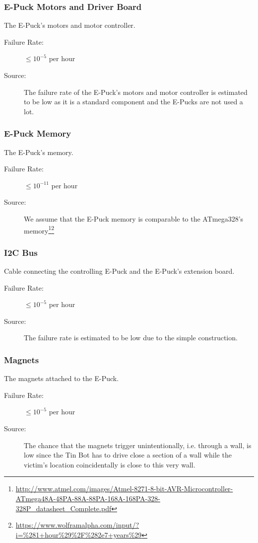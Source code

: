 \documentclass[a4paper,parskip,headheight=38pt]{scrartcl} %
\begin{document}
\subsubsection{E-Puck Motors and Driver Board}
The E-Puck's motors and motor controller.
\begin{description}
	\item[Failure Rate:] $\leq 10^{-5}$ per hour
	\item[Source:] The failure rate of the E-Puck's motors and motor controller is estimated to be low as it is a standard component and the E-Pucks are not used a lot.
\end{description}

\subsubsection{E-Puck Memory}
The E-Puck's memory.
\begin{description}
	\item[Failure Rate:] $\leq 10^{-11}$ per hour
	\item[Source:] We assume that the E-Puck memory is comparable to the ATmega328's memory\footnote{\url{http://www.atmel.com/images/Atmel-8271-8-bit-AVR-Microcontroller-ATmega48A-48PA-88A-88PA-168A-168PA-328-328P\_datasheet\_Complete.pdf}}\footnote{\url{https://www.wolframalpha.com/input/?i=\%281+hour\%29\%2F\%282e7+years\%29}}
\end{description}

\subsubsection{I2C Bus}
Cable connecting the controlling E-Puck and the E-Puck's extension board.
\begin{description}
	\item[Failure Rate:] $\leq 10^{-5}$ per hour
	\item[Source:] The failure rate is estimated to be low due to the simple construction.
\end{description}

\subsubsection{Magnets}
The magnets attached to the E-Puck.
\begin{description}
	\item[Failure Rate:] $\leq 10^{-5}$ per hour
	\item[Source:] The chance that the magnets trigger unintentionally, i.e. through a wall, is low since the Tin Bot has to drive close a section of a wall while the victim's location coincidentally is close to this very wall.
\end{description}
\end{document}
